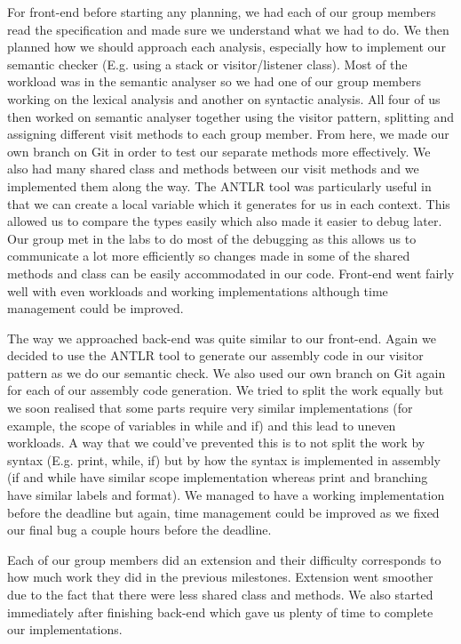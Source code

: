 \documentclass[11pt]{article}
\begin{document}
For front-end before starting any planning, we had each of our group members read the specification and made sure we understand what we had to do. We then planned how we should approach each analysis, especially how to implement our semantic checker (E.g. using a stack or visitor/listener class). Most of the workload was in the semantic analyser so we had one of our group members working on the lexical analysis and another on syntactic analysis. All four of us then worked on semantic analyser together using the visitor pattern, splitting and assigning different visit methods to each group member. From here, we made our own branch on Git in order to test our separate methods more effectively. We also had many shared class and methods between our visit methods and we implemented them along the way. The ANTLR tool was particularly useful in that we can create a local variable which it generates for us in each context. This allowed us to compare the types easily which also made it easier to debug later. Our group met in the labs to do most of the debugging as this allows us to communicate a lot more efficiently so changes made in some of the shared methods and class can be easily accommodated in our code. Front-end went fairly well with even workloads and working implementations although time management could be improved.

\medskip

The way we approached back-end was quite similar to our front-end. Again we decided to use the ANTLR tool to generate our assembly code in our visitor pattern as we do our semantic check. We also used our own branch on Git again for each of our assembly code generation. We tried to split the work equally but we soon realised that some parts require very similar implementations (for example, the scope of variables in while and if) and this lead to uneven workloads. A way that we could've prevented this is to not split the work by syntax (E.g. print, while, if) but by how the syntax is implemented in assembly (if and while have similar scope implementation whereas print and branching have similar labels and format). We managed to have a working implementation before the deadline but again, time management could be improved as we fixed our final bug a couple hours before the deadline.

\medskip

Each of our group members did an extension and their difficulty corresponds to how much work they did in the previous milestones. Extension went smoother due to the fact that there were less shared class and methods. We also started immediately after finishing back-end which gave us plenty of time to complete our implementations.
\end{document}
